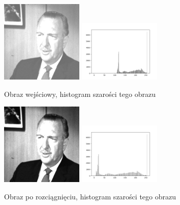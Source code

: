 \documentclass[final,a4paper,openany,12pt]{mwbk}
\begin{document}
\begin{figure}[H]
	\begin{center}
		\includegraphics[width=0.35\textwidth]{gentelman_gray_moveHist_result}
		\includegraphics[width=0.35\textwidth]{gentelman_gray_moveHist_histogram}
	\end{center}
	\caption{Obraz wejściowy, histogram szarości tego obrazu}
\end{figure}

\begin{figure}[H]
	\begin{center}
		\includegraphics[width=0.35\textwidth]{gentelman_gray_stretchHist_result}
		\includegraphics[width=0.35\textwidth]{gentelman_gray_stretchHist_histogram}
	\end{center}
	\caption{Obraz po rozciągnięciu, histogram szarości tego obrazu}
\end{figure}
\end{document}
